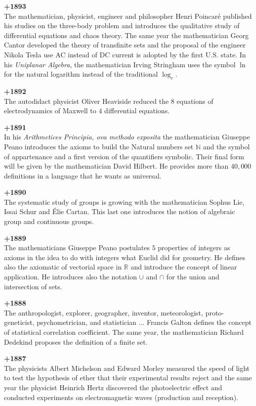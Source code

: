 \textbf{+1893}\\
The mathematician, physicist, engineer and philosopher Henri Poincaré published his studies on the three-body problem and introduces the qualitative study of differential equations and chaos theory. The same year the mathematician Georg Cantor developed the theory of transfinite sets and the proposal of the engineer Nikola Tesla use AC instead of DC current is adopted by the first U.S. state. In his \textit{Uniplanar Algebra}, the mathematician Irving Stringham uses the symbol $\ln$ for the natural logarithm instead of the traditional $\log_e$.

\textbf{+1892}\\
The autodidact physicist Oliver Heaviside reduced the 8 equations of electrodynamics of Maxwell to $4$ differential equations. 

\textbf{+1891}\\
In his \textit{Arithmetices Principia, ova methodo exposita} the mathematician Giuseppe Peano introduces the axioms to build the Natural numbers set $\mathbb{N}$ and the symbol of appartenance and a first version of the quantifiers symbolic. Their final form will be given by the mathematician David Hilbert. He provides more than $40,000$ definitions in a language that he wants as universal.

\textbf{+1890}\\
The systematic study of groups is growing with the mathematician Sophus Lie, Issai Schur and Élie Cartan. This last one introduces the notion of algebraic group and continuous groups. 

\textbf{+1889}\\
The mathematicians Giuseppe Peano postulates $5$ properties of integers as axioms in the idea to do with integers what Euclid did for geometry. He defines also the axiomatic of vectorial space in $\mathbb{R}$ and introduce the concept of linear application. He introduces also the notation $\cup$ and $\cap$ for the union and intersection of sets.

\textbf{+1888}\\
The anthropologist, explorer, geographer, inventor, meteorologist, proto-geneticist, psychometrician, and statistician ... Francis Galton defines the concept of statistical correlation coefficient. The same year, the mathematician Richard Dedekind proposes the definition of a finite set. 

\textbf{+1887}\\
The physicists Albert Michelson and Edward Morley measured the speed of light to test the hypothesis of ether that their experimental results reject and the same year the physicist Heinrich Hertz discovered the photoelectric effect and conducted experiments on electromagnetic waves (production and reception).

